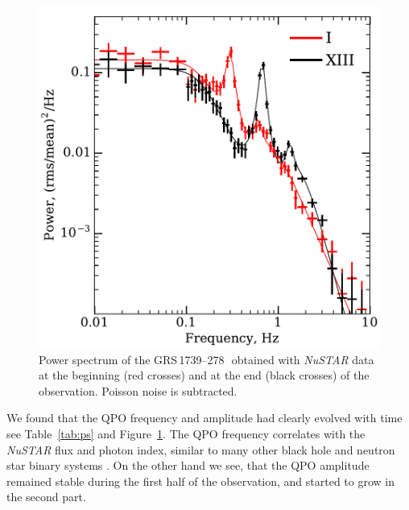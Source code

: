 \documentclass[a4paper,fleqn,usenatbib]{mnras}
\def\grs{{GRS\,1739--278\,}}
\begin{document}
\begin{figure}
        \includegraphics[width=\columnwidth]{qpo_centroid_evolution.pdf}
        \caption{Power spectrum of the \grs\ obtained with {\it NuSTAR} data at the beginning (red crosses) and at the end (black crosses) of the observation. Poisson noise is subtracted.}
        \label{fig:qpo}
\end{figure}


We found that the QPO frequency and amplitude had clearly evolved with time see Table~\ref{tab:ps} and Figure~\ref{fig:qpo}.
The QPO frequency correlates with the {\it NuSTAR} flux and photon index, similar to many other black hole and neutron star binary systems \citep[see, e.g.,][]{2003A&A...397..729V,2003A&A...407.1039P}.
On the other hand we see, that the QPO amplitude remained stable during the first half of the observation, and started to grow in the second part.
\end{document}
